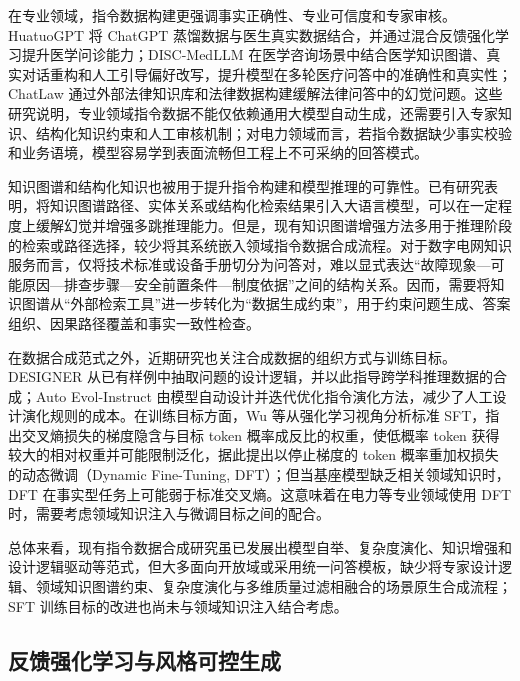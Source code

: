 \documentclass[fontset=fandol,type=master,campus=shenzhen,etitleauto=true]{hithesisbook}
\begin{document}
在专业领域，指令数据构建更强调事实正确性、专业可信度和专家审核。HuatuoGPT 将 ChatGPT 蒸馏数据与医生真实数据结合，并通过混合反馈强化学习提升医学问诊能力\cite{ref28}；DISC-MedLLM 在医学咨询场景中结合医学知识图谱、真实对话重构和人工引导偏好改写，提升模型在多轮医疗问答中的准确性和真实性\cite{ref29}；ChatLaw 通过外部法律知识库和法律数据构建缓解法律问答中的幻觉问题\cite{ref13}。这些研究说明，专业领域指令数据不能仅依赖通用大模型自动生成，还需要引入专家知识、结构化知识约束和人工审核机制；对电力领域而言，若指令数据缺少事实校验和业务语境，模型容易学到表面流畅但工程上不可采纳的回答模式。

知识图谱和结构化知识也被用于提升指令构建和模型推理的可靠性。已有研究表明，将知识图谱路径、实体关系或结构化检索结果引入大语言模型，可以在一定程度上缓解幻觉并增强多跳推理能力\cite{ref15,ref16}。但是，现有知识图谱增强方法多用于推理阶段的检索或路径选择，较少将其系统嵌入领域指令数据合成流程。对于数字电网知识服务而言，仅将技术标准或设备手册切分为问答对，难以显式表达“故障现象—可能原因—排查步骤—安全前置条件—制度依据”之间的结构关系。因而，需要将知识图谱从“外部检索工具”进一步转化为“数据生成约束”，用于约束问题生成、答案组织、因果路径覆盖和事实一致性检查。

在数据合成范式之外，近期研究也关注合成数据的组织方式与训练目标。DESIGNER 从已有样例中抽取问题的设计逻辑，并以此指导跨学科推理数据的合成\cite{ref54}；Auto Evol-Instruct 由模型自动设计并迭代优化指令演化方法，减少了人工设计演化规则的成本\cite{ref53}。在训练目标方面，Wu 等从强化学习视角分析标准 SFT，指出交叉熵损失的梯度隐含与目标 token 概率成反比的权重，使低概率 token 获得较大的相对权重并可能限制泛化，据此提出以停止梯度的 token 概率重加权损失的动态微调（Dynamic Fine-Tuning, DFT）；但当基座模型缺乏相关领域知识时，DFT 在事实型任务上可能弱于标准交叉熵\cite{ref82}。这意味着在电力等专业领域使用 DFT 时，需要考虑领域知识注入与微调目标之间的配合。

总体来看，现有指令数据合成研究虽已发展出模型自举、复杂度演化、知识增强和设计逻辑驱动等范式，但大多面向开放域或采用统一问答模板，缺少将专家设计逻辑、领域知识图谱约束、复杂度演化与多维质量过滤相融合的场景原生合成流程；SFT 训练目标的改进也尚未与领域知识注入结合考虑。

\subsection{反馈强化学习与风格可控生成}
\end{document}
